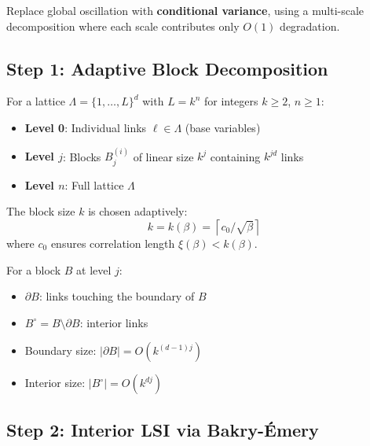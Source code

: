\begin{strategy}
Replace global oscillation with \textbf{conditional variance}, using a multi-scale 
decomposition where each scale contributes only $O(1)$ degradation.
\end{strategy}

\subsection{Step 1: Adaptive Block Decomposition}

\begin{definition}
\label{def:block-structure}
For a lattice $\Lambda = \{1, \ldots, L\}^d$ with $L = k^n$ for integers $k \geq 2$, $n \geq 1$:
\begin{itemize}
\item \textbf{Level 0}: Individual links $\ell \in \Lambda$ (base variables)
\item \textbf{Level $j$}: Blocks $B_j^{(i)}$ of linear size $k^j$ containing $k^{jd}$ links
\item \textbf{Level $n$}: Full lattice $\Lambda$
\end{itemize}
The block size $k$ is chosen adaptively:
\begin{equation}
k = k(\beta) = \left\lceil c_0 / \sqrt{\beta} \right\rceil
\end{equation}
where $c_0$ ensures correlation length $\xi(\beta) < k(\beta)$.
\end{definition}

\begin{definition}
\label{def:boundary-interior}
For a block $B$ at level $j$:
\begin{itemize}
\item $\partial B$: links touching the boundary of $B$
\item $B^\circ = B \setminus \partial B$: interior links
\item Boundary size: $|\partial B| = O(k^{(d-1)j})$
\item Interior size: $|B^\circ| = O(k^{dj})$
\end{itemize}
\end{definition}

\subsection{Step 2: Interior LSI via Bakry-Émery}

